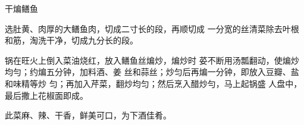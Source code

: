 \begin{recipe}{干煸鳝鱼}

\ingredients




\cooking

\step 选肚黄、肉厚的大鳝鱼肉，切成二寸长的段，再顺切成 一分宽的丝清菜除去叶根和筋，淘洗干净，切成九分长的段。

\step 锅在旺火上倒入菜油烧红，放入鳝鱼丝煸炒，煸炒时 荽不断用汤瓢翻动，使煸炒均勻；约煸五分钟，加料酒、姜 丝和蒜丝；炒匀后再煸一分钟，即放入豆瓣、盐和味精等炒 匀；再加入芹菜，翻炒均匀；然后烹入醋炒勻，马上起锅盛 人盘中，最后撒上花椒面即成。

\notes

此菜麻、辣、干香，鲜美可口，为下酒佳肴。

\end{recipe}

